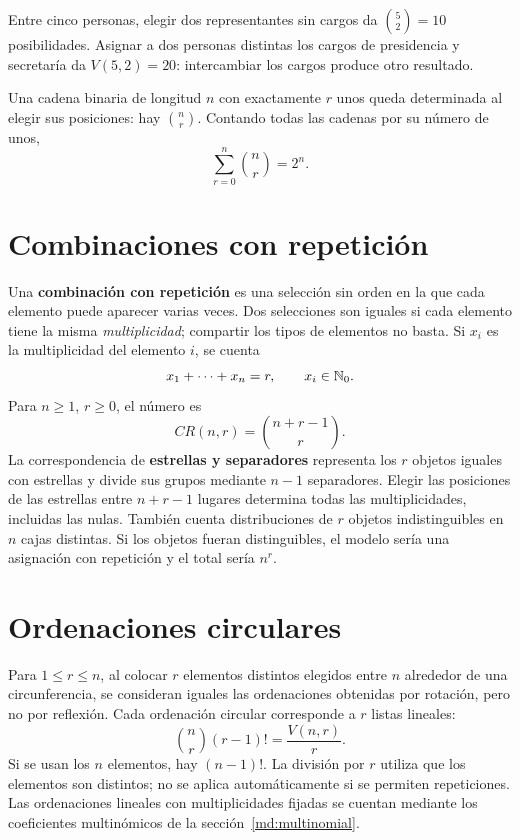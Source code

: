 \begin{ejemplo}
Entre cinco personas, elegir dos representantes sin cargos da
$\binom52=10$ posibilidades. Asignar a dos personas distintas
los cargos de presidencia y secretaría da $V(5,2)=20$:
intercambiar los cargos produce otro resultado.
\end{ejemplo}

Una cadena binaria de longitud $n$ con exactamente $r$ unos queda
determinada al elegir sus posiciones: hay $\binom nr$.
Contando todas las cadenas por su número de unos,
\[
 \sum_{r=0}^n\binom nr=2^n.
\]

\section{Combinaciones con repetición}
\label{md:combinaciones-repeticion}

Una \textbf{combinación con repetición} es una selección sin orden
en la que cada elemento puede aparecer varias veces.
Dos selecciones son iguales si cada elemento tiene la misma
\emph{multiplicidad}; compartir los tipos de elementos no basta.
Si $x_i$ es la multiplicidad del elemento $i$, se cuenta
\[
 x_1+\cdots+x_n=r,\qquad x_i\in\mathbb{N}_0.
\]
Para $n\ge1$, $r\ge0$, el número es
\[
 \boxed{CR(n,r)=\binom{n+r-1}{r}.}
\]
La correspondencia de \textbf{estrellas y separadores} representa los
$r$ objetos iguales con estrellas y divide sus grupos mediante $n-1$
separadores. Elegir las posiciones de las estrellas entre $n+r-1$
lugares determina todas las multiplicidades, incluidas las nulas.
También cuenta distribuciones de $r$ objetos indistinguibles en
$n$ cajas distintas. Si los objetos fueran distinguibles, el modelo
sería una asignación con repetición y el total sería $n^r$.

\section{Ordenaciones circulares}

Para $1\le r\le n$, al colocar $r$ elementos distintos elegidos
entre $n$ alrededor de una circunferencia, se consideran iguales
las ordenaciones obtenidas por rotación, pero no por reflexión.
Cada ordenación circular corresponde a $r$ listas lineales:
\[
 \binom nr(r-1)!=\frac{V(n,r)}r.
\]
Si se usan los $n$ elementos, hay $(n-1)!$.
La división por $r$ utiliza que los elementos son distintos;
no se aplica automáticamente si se permiten repeticiones.
Las ordenaciones lineales con multiplicidades fijadas se cuentan
mediante los coeficientes multinómicos de la sección~\ref{md:multinomial}.
